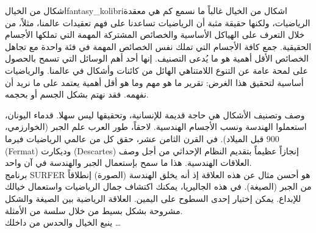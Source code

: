 \begin{surferIntroPage}{اشكال من الخيال}{fantasy_kolibri}{اشكال من الخيال}
غالباً ما نسمع كم هي معقدة الرياضيات، ولكنها حقيقة مثبة أن الرياضيات تساعدنا على فهم تعقيدات عالمنا، مثلاً، من خلال التعرف على الهياكل الأساسية والخصائص المشتركة المهمة التي تملكها الأجسام الحقيقية. جمع كافة الأجسام التي تملك نفس الخصائص المهمة في فئة واحدة مع تجاهل الخصائص الأقل أهمية هو ما يُدعى التصنيف. إنها أحد أهم الوسائل التي تسمح بالحصول على لمحة عامة عن التنوع اللامتناهي الهائل من كائنات وأشكال في عالمنا. والرياضيات أساسية لتحقيق هذا الغرض: تقرير ما هو مهم وما هو أقل أهمية يعتمد على ما نريد أن نفهمه. فقد نهتم بشكل الجسم أو بحجمه.
 \\

\vspace{0.4cm}

وصف وتصنيف الأشكال هي حاجة قديمة للإنسانية، وتحقيقها ليس سهلا. قدماء اليونان، استعملوا الهندسة ونسب الأجسام الهندسية. لاحقاً، طور العرب علم الجبر (الخوارزمي، 900 قبل الميلاد). في القرن الثامن عشر، حقق كل من عالمي الرياضيات فيرما
 \textenglish{(Fermat)}
  وديكارت
 \textenglish{(Descartes)}
    إنجازاً عظيماً بتقديم النظام الإحداثي من أجل وصف العلاقات الهندسية. هذا ما سمح بإستعمال الجبر والهندسة في آن واحد.
\\
\vspace{0.4cm}
برنامج SURFER هو أحسن مثال عن هذه العلاقة إذ أنه يخلق الهندسة (الصورة) إنطلاقاً من الجبر (الصيغة).
في هذه الجاليريا، يمكنك اكتشاف جمال الرياضيات واستعمال خيالك للإبداع. يمكن إختيار إحدى السطوح على اليمين. العلاقة الرياضية بين الصيغة والشكل مشروحة بشكل بسيط من خلال سلسة من الأمثلة.\\
ينبع الخيال والحدس من داخلك \dots
\end{surferIntroPage}
